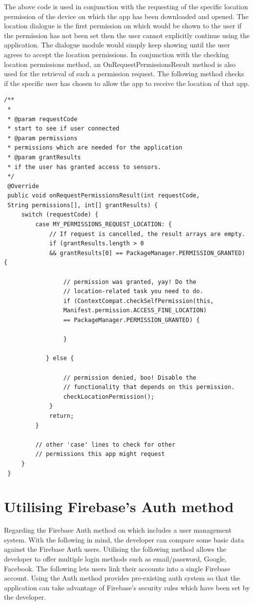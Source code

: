 \par
The above code is used in conjunction with the requesting of the specific location permission of the device on which the app has been downloaded and opened. The location dialogue is the first permission on which would be shown to the user if the permission has not been set then the user cannot explicitly continue using the application. The dialogue module would simply keep showing until the user agrees to accept the location permissions. In conjunction with the checking location permissions method, an OnRequestPermissionsResult method is also used for the retrieval of such a permission request. The following method checks if the specific user has chosen to allow the app to receive the location of that app.
\newline
\begin{lstlisting}[style=myCustomMatlabStyle, basicstyle=\small, breaklines, caption=Permissions Request Example,captionpos=b] 
 /**
 *
 * @param requestCode
 * start to see if user connected
 * @param permissions
 * permissions which are needed for the application
 * @param grantResults
 * if the user has granted access to sensors.
 */
 @Override
 public void onRequestPermissionsResult(int requestCode,
 String permissions[], int[] grantResults) {
     switch (requestCode) {
         case MY_PERMISSIONS_REQUEST_LOCATION: {
             // If request is cancelled, the result arrays are empty.
             if (grantResults.length > 0
             && grantResults[0] == PackageManager.PERMISSION_GRANTED) {
             
                 // permission was granted, yay! Do the
                 // location-related task you need to do.
                 if (ContextCompat.checkSelfPermission(this,
                 Manifest.permission.ACCESS_FINE_LOCATION)
                 == PackageManager.PERMISSION_GRANTED) {
                 
                 }
         
            } else {
         
                 // permission denied, boo! Disable the
                 // functionality that depends on this permission.
                 checkLocationPermission();
             }
             return;
         }
         
         // other 'case' lines to check for other
         // permissions this app might request
     }
 }
\end{lstlisting}

\section{Utilising Firebase's Auth method}
Regarding the Firebase Auth method on which includes a user management system. With the following in mind, the developer can compare some basic data against the Firebase Auth users. Utilising the following method allows the developer to offer multiple login methods such as email/password, Google, Facebook. The following lets users link their accounts into a single Firebase account. Using the Auth method provides pre-existing auth system so that the application can take advantage of Firebase's security rules which have been set by the developer.

